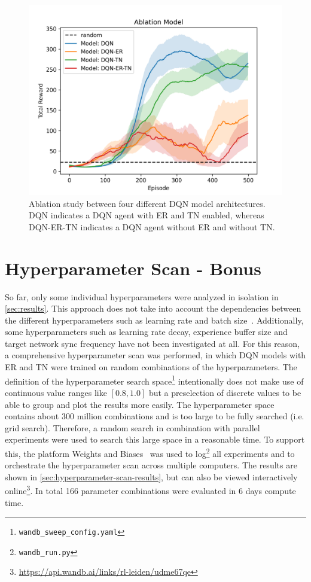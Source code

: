 \documentclass{article}
\begin{document}
\begin{figure}[ht!]
   \centering
   \includegraphics[width=0.9\columnwidth]{assets/Ablation/ablation_study.png}
   \caption{Ablation study between four different DQN model architectures. DQN indicates a DQN agent with ER and TN enabled, whereas DQN-ER-TN indicates a DQN agent without ER and without TN.
   }
   \label{fig:ablation_study}
\end{figure}


\section{Hyperparameter Scan - Bonus}
\label{sec:bonus}
So far, only some individual hyperparameters were analyzed in isolation in \autoref{sec:results}.
This approach does not take into account the dependencies between the different hyperparameters 
such as learning rate and batch size~\cite{DBLP:conf/iclr/SmithKYL18}.
Additionally, some hyperparameters such as learning rate decay, experience buffer size and target network sync frequency have not been investigated at all.
For this reason, a comprehensive hyperparameter scan was performed, in which DQN models with ER and TN were trained on random combinations of the hyperparameters. 
The definition of the hyperparameter search space\footnote{\texttt{wandb\_sweep\_config.yaml}} 
intentionally does not make use of continuous value ranges like $[0.8, 1.0]$ but a preselection of discrete values to be able to group and plot the results more easily.
The hyperparameter space contains about 300 million combinations and is too large to be fully searched (i.e. grid search). 
Therefore, a random search in combination with parallel experiments were used to search this large space in a reasonable time.
To support this, the platform Weights and Biases~\cite{wandb} was used to log\footnote{\texttt{wandb\_run.py}} all experiments and to orchestrate the hyperparameter scan across multiple computers.
The results are shown in \autoref{sec:hyperparameter-scan-results},
but can also be viewed interactively online\footnote{\url{https://api.wandb.ai/links/rl-leiden/udme67qe}}. 
In total 166 parameter combinations were evaluated in 6 days compute time.
\end{document}
